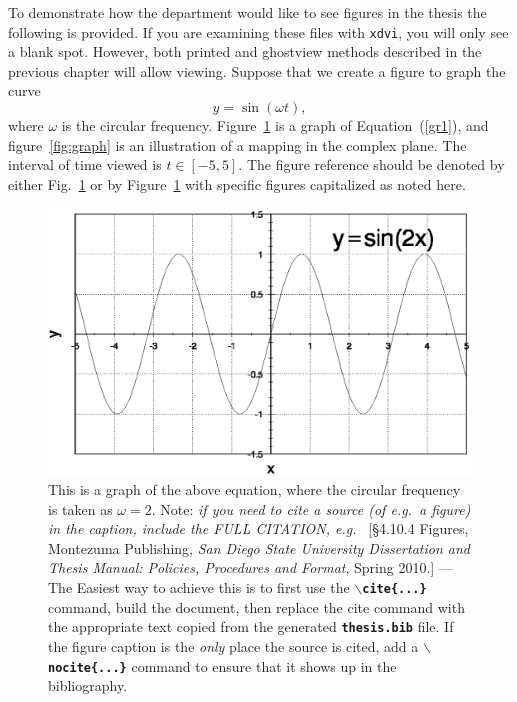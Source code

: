 To demonstrate how the department would like to see figures in the
thesis the following is provided. If you are examining these files
with \texttt{xdvi}, you will only see a blank spot. However, both
printed and ghostview methods described in the previous chapter will
allow viewing.  Suppose that we create a figure to graph the curve
\begin{equation}
  y=\sin(\omega t), \label{gr1}
\end{equation}
where $\omega$ is the circular frequency.  Figure~\ref{fig1} is a
graph of Equation~(\ref{gr1}), and figure~\ref{fig:graph} is an
illustration of a mapping in the complex plane. The interval of time
viewed is $t \in [-5,5]$. The figure reference should be denoted by
either Fig.~\ref{fig1} or by Figure~\ref{fig1} with specific figures
capitalized as noted here.
\begin{figure}[ht]
  \centering
  \begin{minipage}{0.9\linewidth}
    \includegraphics[width=\linewidth]{Figures/plot2.eps}
    \caption{This is a graph of the above equation, where the circular
      frequency is taken as $\omega = 2$.\label{fig1} Note: \emph{if
        you need to cite a source (of e.g.~a figure) in the caption,
        include the FULL CITATION, e.g.~} [\S 4.10.4 Figures,
      {\sc Montezuma Publishing}, {\em San Diego State
        University Dissertation and Thesis Manual: Policies,
        Procedures and Format}, Spring 2010.] --- The Easiest way to
      achieve this is to first use the
      \textbf{\texttt{$\backslash$cite\{...\}}} command, build the
      document, then replace the cite command with the appropriate
      text copied from the generated \textbf{\texttt{thesis.bib}}
      file.  If the figure caption is the \emph{only} place the source
      is cited, add a \textbf{\texttt{$\backslash$nocite\{...\}}}
      command to ensure that it shows up in the bibliography.}
  \end{minipage}
\end{figure}


